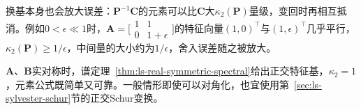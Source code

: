 换基本身也会放大误差：$\bm P^{-1}\bm C$的元素可以比$\bm C$大$\kappa_2(\bm P)$量级，变回时再相互抵消。例如$0<\epsilon\ll1$时，$\bm A=\bigl[\begin{smallmatrix}1&1\\0&1+\epsilon\end{smallmatrix}\bigr]$的特征向量$(1,0)^\top$与$(1,\epsilon)^\top$几乎平行，$\kappa_2(\bm P)\geq1/\epsilon$，中间量的大小约为$1/\epsilon$，舍入误差随之被放大。

$\bm A$、$\bm B$实对称时，谱定理~\ref{thm:ls-real-symmetric-spectral}给出正交特征基，$\kappa_2=1$，元素公式既简单又可靠。一般情形即使可以对角化，也宜使用第~\ref{sec:ls-sylvester-schur}节的正交Schur变换。
